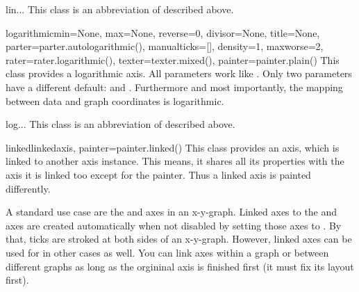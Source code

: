 \begin{classdesc}{lin}{...}
  This class is an abbreviation of  described above.
\end{classdesc}

\begin{classdesc}{logarithmic}{min=None, max=None, reverse=0, divisor=None, title=None,
                               parter=parter.autologarithmic(), manualticks=[],
                               density=1, maxworse=2, rater=rater.logarithmic(),
                               texter=texter.mixed(), painter=painter.plain()}
  This class provides a logarithmic axis. All parameters work like
  . Only two parameters have a different default:
   and . Furthermore and most importantly, the
  mapping between data and graph coordinates is logarithmic.
\end{classdesc}

\begin{classdesc}{log}{...}
This class is an abbreviation of  described above.
\end{classdesc}

\begin{classdesc}{linked}{linkedaxis, painter=painter.linked()}
  This class provides an axis, which is linked to another axis
  instance. This means, it shares all its properties with the axis it
  is linked too except for the painter. Thus a linked axis is painted
  differently.

  A standard use case are the  and  axes in an
  x-y-graph. Linked axes to the  and  axes are created
  automatically when not disabled by setting those axes to
  . By that, ticks are stroked at both sides of an
  x-y-graph. However, linked axes can be used for in other cases as
  well. You can link axes within a graph or between different graphs
  as long as the orgininal axis is finished first (it must fix its
  layout first).
\end{classdesc}


